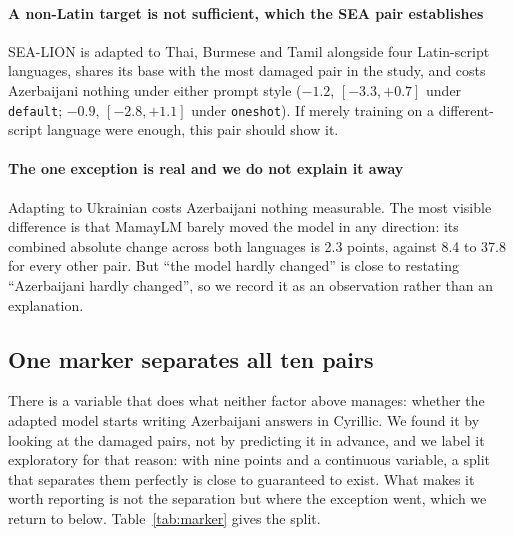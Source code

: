 \documentclass[final]{clv2025}
\begin{document}
\paragraph{A non-Latin target is not sufficient, which the SEA pair
establishes} SEA-LION is adapted to Thai, Burmese and Tamil alongside four
Latin-script languages, shares its base with the most damaged pair in the
study, and costs Azerbaijani nothing under either prompt style ($-1.2$,
$[-3.3, +0.7]$ under \texttt{default}; $-0.9$, $[-2.8, +1.1]$ under
\texttt{oneshot}). If merely training on a different-script language were
enough, this pair should show it.

\paragraph{The one exception is real and we do not explain it away} Adapting
to Ukrainian costs Azerbaijani nothing measurable. The most visible difference
is that MamayLM barely moved the model in any direction: its combined absolute
change across both languages is 2.3 points, against 8.4 to 37.8 for every other
pair. But ``the model hardly changed'' is close to restating ``Azerbaijani
hardly changed'', so we record it as an observation rather than an explanation.

\subsection{One marker separates all ten pairs}

There is a variable that does what neither factor above manages: whether the
adapted model starts writing Azerbaijani answers in Cyrillic. We found it by
looking at the damaged pairs, not by predicting it in advance, and we label it
exploratory for that reason: with nine points and a continuous variable, a
split that separates them perfectly is close to guaranteed to exist. What makes
it worth reporting is not the separation but where the exception went, which we
return to below. Table~\ref{tab:marker} gives the split.
\end{document}
